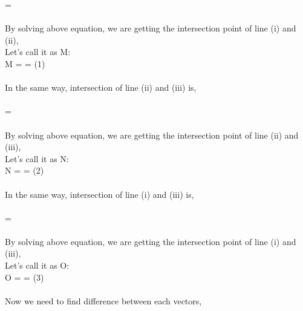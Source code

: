 \documentclass[journal,12pt,twocolumn]{IEEEtran}
\begin{document}
 = \\
\\
By solving above equation, we are getting the intersection point of line (i) and (ii),\\
Let's call it as M:
\\

M =  =  \qquad (1)\\
\\
In the same way, intersection of line (ii) and (iii) is,\\
\\

 = \\
\\
By solving above equation, we are getting the intersection point of line (ii) and (iii),\\
Let's call it as N:
\\

N =  =  \qquad (2)\\
\\
In the same way, intersection of line (i) and (iii) is,\\
\\

 = \\
\\
By solving above equation, we are getting the intersection point of line (i) and (iii),\\
Let's call it as O:
\\

O =  =  \qquad (3)\\
\\
Now we need to find difference between each vectors,\\
\end{document}
